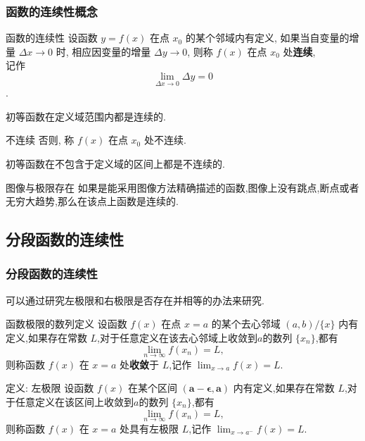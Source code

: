 \documentclass[
10pt,
aspectratio=43,
]{beamer}
\begin{document}
\begin{frame}
\frametitle{函数的连续性概念}
\begin{block}{函数的连续性}
 设函数 $y=f(x)$ 在点 $x_0$ 的某个邻域内有定义, 如果当自变量的增量 $\Delta x \rightarrow 0$ 时, 相应因变量的增量 $\Delta y \rightarrow 0$, 则称 $f(x)$ 在点 $x_0$ 处\textbf{连续},\\
 记作 $$\lim _{\Delta x \rightarrow 0} \Delta y=0$$. 
\end{block}
\pause
初等函数在定义域范围内都是连续的.
\pause
\begin{exampleblock}{不连续}
否则, 称 $f(x)$ 在点 $x_0$ 处不连续.
\end{exampleblock}
\pause
初等函数在不包含于定义域的区间上都是不连续的.

\begin{alertblock}{图像与极限存在}
	如果是能采用图像方法精确描述的函数,图像上没有跳点,断点或者无穷大趋势,那么在该点上函数是连续的.
\end{alertblock}

\end{frame}

\subsection{分段函数的连续性}
\begin{frame}
\frametitle{分段函数的连续性}
	可以通过研究左极限和右极限是否存在并相等的办法来研究.

\begin{block}{函数极限的数列定义}
	设函数 $f(x)$ 在点 $x=a$ 的某个去心邻域 $(a,b)/\{x\}$ 内有定义,如果存在常数 $L$,对于任意定义在该去心邻域上收敛到$a$的数列 $\{x_n\}$,都有 
 \begin{equation*}
\lim_{n\to\infty} f(x_n) = L,
 \end{equation*}
 则称函数 $f(x)$ 在 $x=a$ 处\textbf{收敛}于 $L$,记作 $\lim_{x \to a} f(x) = L$.
\end{block}
\begin{block}{定义: 左极限}
	设函数 $f(x)$ 在某个区间 $\bm{(a-\epsilon,a)}$ 内有定义,如果存在常数 $L$,对于任意定义在该区间上收敛到$a$的数列 $\{x_n\}$,都有 
 \begin{equation*}
\lim_{n\to\infty} f(x_n) = L,
 \end{equation*}
 则称函数 $f(x)$ 在 $x=a$ 处具有左极限 $L$,记作 $\lim_{x \to a^{-}} f(x) = L$.
\end{block}
\end{frame}
\end{document}
